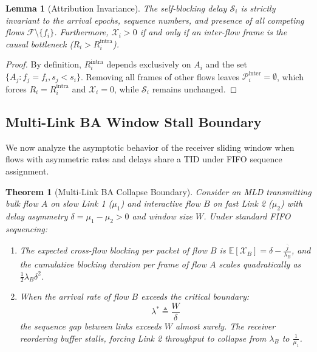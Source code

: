 \documentclass[10pt,journal,compsoc]{IEEEtran}
\newtheorem{theorem}{Theorem}
\newtheorem{lemma}{Lemma}
\begin{document}
\begin{lemma}[Attribution Invariance]
\label{lem:invariance}
The self-blocking delay $\mathcal{S}_i$ is strictly invariant to the arrival epochs, sequence numbers, and presence of all competing flows $\mathcal{F} \setminus \{f_i\}$. Furthermore, $\mathcal{X}_i > 0$ if and only if an inter-flow frame is the causal bottleneck ($R_i > R_i^{\text{intra}}$).
\end{lemma}
\begin{proof}
By definition, $R_i^{\text{intra}}$ depends exclusively on $A_i$ and the set $\{A_j : f_j = f_i, s_j < s_i\}$. Removing all frames of other flows leaves $\mathcal{P}_i^{\text{inter}} = \emptyset$, which forces $R_i = R_i^{\text{intra}}$ and $\mathcal{X}_i = 0$, while $\mathcal{S}_i$ remains unchanged.
\end{proof}

\subsection{Multi-Link BA Window Stall Boundary}

We now analyze the asymptotic behavior of the receiver sliding window when flows with asymmetric rates and delays share a TID under FIFO sequence assignment.

\begin{theorem}[Multi-Link BA Collapse Boundary]
\label{thm:collapse}
Consider an MLD transmitting bulk flow $A$ on slow Link 1 ($\mu_1$) and interactive flow $B$ on fast Link 2 ($\mu_2$) with delay asymmetry $\delta = \mu_1 - \mu_2 > 0$ and window size $W$. Under standard FIFO sequencing:
\begin{enumerate}
    \item The expected cross-flow blocking per packet of flow $B$ is $\mathbb{E}[\mathcal{X}_B] = \delta - \frac{\bar{j}}{\lambda_B}$, and the cumulative blocking duration per frame of flow $A$ scales quadratically as $\frac{1}{2} \lambda_B \delta^2$.
    \item When the arrival rate of flow $B$ exceeds the critical boundary:
    \begin{equation}
        \lambda^* \triangleq \frac{W}{\delta}
    \end{equation}
    the sequence gap between links exceeds $W$ almost surely. The receiver reordering buffer stalls, forcing Link 2 throughput to collapse from $\lambda_B$ to $\frac{1}{\mu_1}$.
\end{enumerate}
\end{theorem}
\end{document}
